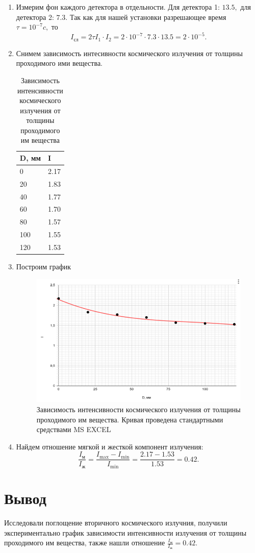 \documentclass[a4paper,12pt]{article}
\theoremstyle{plain} %
\theoremstyle{definition} %
\theoremstyle{remark} %
\begin{document}
\begin{enumerate}
    \item Измерим фон каждого детектора в отдельности. Для детектора 1: $13.5,$ для детектора 2: $7.3.$ Так как для нашей установки разрешающее время $\tau = 10^{-7} c,$ то 
    \[I_{\text{сл}} = 2 \tau I_1 \cdot I_2 = 2 \cdot 10^{-7} \cdot 7.3 \cdot 13.5 = 2\cdot 10^{-5}.\]
    \item Снимем зависимость интесивности космического излучения от толщины проходимого ими вещества.


\begin{table}[H]
\caption{Зависимость интенсивности космического излучения от толщины проходимого им вещества}
\begin{tabular}{|l|l|}
\hline
\rowcolor[HTML]{FCFF2F} 
D, мм & I    \\ \hline
0     & 2.17 \\ \hline
20    & 1.83 \\ \hline
40    & 1.77 \\ \hline
60    & 1.70 \\ \hline
80    & 1.57 \\ \hline
100   & 1.55 \\ \hline
120   & 1.53 \\ \hline
\end{tabular}
\end{table}
    \newpage
    \item Построим график 
    
    \begin{figure}[H]
        \includegraphics[width= \textwidth]{Materials/graph/chart.png}
        \caption{Зависимость интенсивности космического излучения от толщины проходимого им вещества. Кривая проведена стандартными средствами MS EXCEL }
        
    \end{figure}
    
    \item Найдем отношение мягкой и жесткой компонент излучения:
    \[\frac{I_{\text{м}}}{I_\text{ж}} = \frac{I_\text{max} - I_\text{min}}{I_\text{min}} = \frac{2.17 - 1.53}{1.53} = 0.42.\]
\end{enumerate}

\section{Вывод}
Исследовали поглощение вторичного космического излучния, получили экспериментально график зависимости интенсивности излучения от толщины проходимого им вещества, также нашли отношение $\frac{I_{\text{м}}}{I_\text{ж}} = 0.42.$
\end{document}
